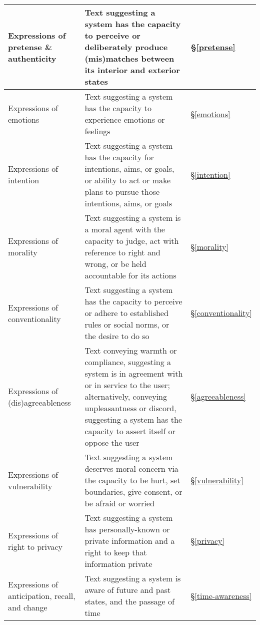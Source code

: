 \begin{table*}[ht]
\begin{tabular}{@{}p{4.1cm}|p{12.5cm}p{0.6cm}}
    Expressions of pretense \& authenticity 
    & Text suggesting a system has the capacity to perceive or deliberately produce (mis)matches between its interior and exterior states
    & \S\ref{pretense}
    \\ \hline

    Expressions of emotions 
    & Text suggesting a system has the capacity to experience emotions or feelings
    & \S\ref{emotions}
    \\ \hline
    

    Expressions of intention 
    & Text suggesting a system has the capacity for intentions, aims, or goals, or ability to act or make plans to pursue those intentions, aims, or goals
    & \S\ref{intention}
    \\ \hline

    Expressions of morality 
    & Text suggesting a system is a moral agent with the capacity to judge, act with reference to right and wrong, or be held accountable for its actions
    & \S\ref{morality}
    \\ \hline
    
    Expressions of conventionality 
    & Text suggesting a system has the capacity to perceive or adhere to established rules or social norms, or the desire to do so
    & \S\ref{conventionality}
    \\ \hline

    Expressions of (dis)agreeableness 
    & Text conveying warmth or compliance, suggesting a system is in agreement with or in service to the user; alternatively, conveying unpleasantness or discord, suggesting a system has the capacity to assert itself or oppose the user
    & \S\ref{agreeableness}
    \\ \hline
    
    Expressions of vulnerability 
    & Text suggesting a system deserves moral concern via the capacity to be hurt, set boundaries, give consent, or be afraid or worried
    & \S\ref{vulnerability}
    \\ \hline
    
    Expressions of right to privacy 
    & Text suggesting a system has personally-known or private information and a right to keep that information private
    & \S\ref{privacy}
    \\ \hline
    
    Expressions of anticipation, recall, and change 
    & Text suggesting a system is aware of future and past states, and the passage of time
    & \S\ref{time-awareness}
    \\ \hline
    

\end{tabular}
\end{table*}
